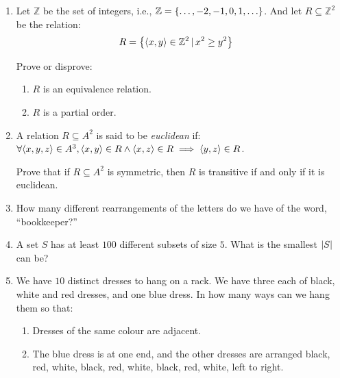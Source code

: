 \documentclass[11pt,onecolumn]{article}
\newcommand{\tuple}[1]{\ensuremath{\left\langle #1 \right\rangle}\xspace}
\newcommand{\set}[1]{\ensuremath{\left\{#1\right\}}\xspace}
\let\originalleft\left
\let\originalright\right
\renewcommand{\left}{\mathopen{}\mathclose\bgroup\originalleft}
\renewcommand{\right}{\aftergroup\egroup\originalright}
\begin{document}
\begin{enumerate}
\item Let $\mathbb{Z}$ be the set of integers, i.e., $\mathbb{Z} = \set{\ldots,-2,-1,0,1,\ldots}$. And let $R\subseteq \mathbb{Z}^2$ be the relation:
\begin{align*}
R &=\set{\tuple{x,y}\in\mathbb{Z}^2\,|\, x^2 \ge y^2}
\end{align*}

Prove or disprove:
\begin{enumerate}
\item $R$ is an equivalence relation.
\item $R$ is a partial order.
\end{enumerate}

\item A relation $R\subseteq A^2$ is said to be \emph{euclidean} if: $\forall \tuple{x,y,z}\in A^3, \tuple{x,y}\in R \wedge \tuple{x,z}\in R \implies \tuple{y,z}\in R$.

Prove that if $R\subseteq A^2$ is symmetric, then $R$ is transitive if and only if it is euclidean.

\item How many different rearrangements of the letters do we have of the word, ``bookkeeper?''

\item A set $S$ has at least $100$ different subsets of size $5$. What is the smallest $\left|S\right|$ can be?

\item We have $10$ distinct dresses to hang on a rack. We have three each of black, white and red dresses, and one blue dress. In how many ways can we hang them so that:
\begin{enumerate}
\item Dresses of the same colour are adjacent.
\item The blue dress is at one end, and the other dresses are arranged black, red, white, black, red, white, black, red, white, left to right.
\end{enumerate}
\end{enumerate}
\end{document}
